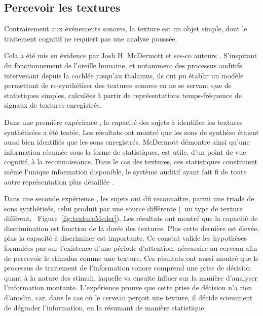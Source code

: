{{\subsection{Percevoir les textures}
\label{sec:ch3_texturePerception}

Contrairement aux événements sonores, la texture est un objet simple, dont le traitement cognitif ne requiert pas une analyse poussée. 

Cela a été mis en évidence par Josh H. McDermott et ses-co auteurs \citep{mcdermott2011sound,mcdermott2013summary}. S'inspirant du fonctionnement de l'oreille humaine, et notamment des processus auditifs intervenant depuis la cochlée jusqu'au thalamus, ils ont pu établir un modèle permettant de re-synthétiser des textures sonores en ne se servant que de statistiques simples, calculées à partir de représentations temps-fréquence de signaux de textures enregistrés. 

Dans une première expérience \citep{mcdermott2011sound}, la capacité des sujets à identifier les textures synthétisées a été testée. Les résultats ont montré que les sons de synthèse étaient aussi bien identifiés que les sons enregistrés. McDermott démontre ainsi qu'une information résumée sous la forme de statistiques, est utile, d'un point de vue cognitif, à la reconnaissance. Dans le cas des textures, ces statistiques constituent même l'unique information disponible, le système auditif ayant fait fi de toute autre représentation plus détaillée \citep{nelken2013ear}.

Dans une seconde expérience \citep{mcdermott2013summary}, les sujets ont dû reconnaître, parmi une triade de sons synthétisés, celui produit par une source différente (\ie~un type de texture différent, \cf~Figure~\ref{fig:textureMcder}). Les résultats ont montré que la capacité de discrimination est fonction de la durée des textures. Plus cette dernière est élevée, plus la capacité à discriminer est importante. Ce constat valide les hypothèses formulées par \citep{saint1995classification} sur l'existence d'une période d'attention, nécessaire au cerveau afin de percevoir le stimulus comme une texture. Ces résultats ont aussi montré que le processus de traitement de l'information sonore comprend une prise de décision quant à la nature des stimuli, laquelle va ensuite influer sur la manière d'analyser l'information montante. L'expérience prouve que cette prise de décision n'a rien d'anodin, car, dans le cas où le cerveau perçoit une texture, il décide sciemment de dégrader l'information, en la résumant de manière statistique.

}}
